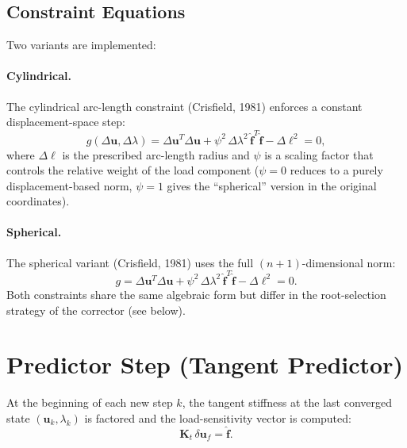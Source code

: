 \subsection{Constraint Equations}

Two variants are implemented:

\paragraph{Cylindrical.}
The cylindrical arc-length constraint (Crisfield, 1981) enforces a
constant displacement-space step:
\begin{equation}
  \label{eq:arc-cylindrical}
  g(\Delta\mathbf{u}, \Delta\lambda)
  = \Delta\mathbf{u}^T \Delta\mathbf{u}
    + \psi^2 \, \Delta\lambda^2 \,
      \hat{\mathbf{f}}^T \hat{\mathbf{f}}
  - \Delta\ell^2 = 0,
\end{equation}
where $\Delta\ell$ is the prescribed arc-length radius and $\psi$ is a
scaling factor that controls the relative weight of the load component
($\psi = 0$ reduces to a purely displacement-based norm,
$\psi = 1$ gives the ``spherical'' version in the original coordinates).

\paragraph{Spherical.}
The spherical variant (Crisfield, 1981) uses the full
$(n+1)$-dimensional norm:
\begin{equation}
  \label{eq:arc-spherical}
  g = \Delta\mathbf{u}^T \Delta\mathbf{u}
    + \psi^2 \, \Delta\lambda^2 \,
      \hat{\mathbf{f}}^T \hat{\mathbf{f}}
  - \Delta\ell^2 = 0.
\end{equation}
Both constraints share the same algebraic form but differ in the
root-selection strategy of the corrector (see below).


\section{Predictor Step (Tangent Predictor)}
\label{sec:arc-predictor}

At the beginning of each new step $k$, the tangent stiffness at the
last converged state $(\mathbf{u}_k, \lambda_k)$ is factored and the
load-sensitivity vector is computed:
\begin{equation}
  \label{eq:arc-duf}
  \mathbf{K}_t \, \delta\mathbf{u}_f = \hat{\mathbf{f}}.
\end{equation}


